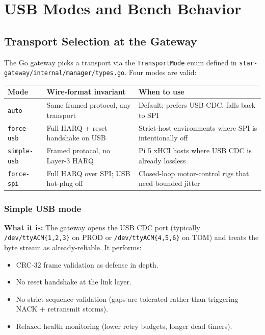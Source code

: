 
\section{USB Modes and Bench Behavior}
\label{section:usb-modes}

\subsection{Transport Selection at the Gateway}

The Go gateway picks a transport via the \texttt{TransportMode} enum
defined in \texttt{star-gateway/internal/manager/types.go}. Four modes
are valid:

\begin{center}
\begin{tabular}{|l|l|l|}
\hline
\textbf{Mode}              & \textbf{Wire-format invariant}        & \textbf{When to use}                                       \\
\hline
\texttt{auto}              & Same framed protocol, any transport   & Default; prefers USB CDC, falls back to SPI                \\
\texttt{force-usb}         & Full HARQ + reset handshake on USB    & Strict-host environments where SPI is intentionally off    \\
\texttt{simple-usb}        & Framed protocol, no Layer-3 HARQ      & Pi 5 xHCI hosts where USB CDC is already lossless          \\
\texttt{force-spi}         & Full HARQ over SPI; USB hot-plug off  & Closed-loop motor-control rigs that need bounded jitter    \\
\hline
\end{tabular}
\end{center}

\subsubsection{Simple USB mode}

\textbf{What it is:} The gateway opens the USB CDC port (typically
\texttt{/dev/ttyACM\{1,2,3\}} on PROD or \texttt{/dev/ttyACM\{4,5,6\}}
on TOM) and treats the byte stream as already-reliable. It performs:

\begin{itemize}
  \item CRC-32 frame validation as defense in depth.
  \item No reset handshake at the link layer.
  \item No strict sequence-validation (gaps are tolerated rather than
        triggering NACK + retransmit storms).
  \item Relaxed health monitoring (lower retry budgets, longer dead
        timers).
\end{itemize}

